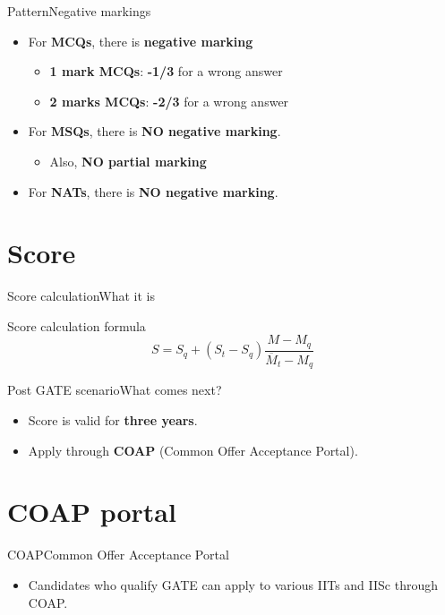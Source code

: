 \documentclass[handout]{beamer}
\begin{document}
\begin{frame}{Pattern}{Negative markings}
    \begin{itemize}
        \item For \textbf{MCQs}, there is \textbf{negative marking}
              \begin{itemize}
                  \item \textbf{1 mark MCQs}: \textbf{-1/3} for a wrong answer
                  \item \textbf{2 marks MCQs}: \textbf{-2/3} for a wrong answer
              \end{itemize}
        \item For \textbf{MSQs}, there is \textbf{NO negative marking}.
              \begin{itemize}
                  \item Also, \textbf{NO partial marking}
              \end{itemize}
        \item For \textbf{NATs}, there is \textbf{NO negative marking}.
    \end{itemize}
\end{frame}

\section{Score}
\begin{frame}{Score calculation}{What it is}
    \begin{block}{Score calculation formula}
        \begin{equation*}
            S=S_{q}+(S_{t}-S_{q}){\frac {M-M_{q}}{{\overline {M}}_{t}-M_{q}}}
        \end{equation*}
    \end{block}
\end{frame}

\begin{frame}{Post GATE scenario}{What comes next?}
    \begin{itemize}
        \item Score is valid for \textbf{three years}.
        \item Apply through \textbf{COAP} (Common Offer Acceptance Portal).
    \end{itemize}
\end{frame}

\section{COAP portal}
\begin{frame}{COAP}{Common Offer Acceptance Portal}
    \begin{itemize}
        \item Candidates who qualify GATE can apply to various IITs and IISc through COAP.
    \end{itemize}
\end{frame}
\end{document}
